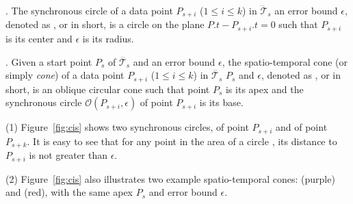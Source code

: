 . The synchronous circle of a data point $P_{s+i}$ ($1\le i\le k$) in $\dddot{\mathcal{T}}_s$ \wrt an error bound $\epsilon$, denoted as , or  in short, is a circle on the plane $P.t-P_{s+i}.t = 0$ such that $P_{s+i}$ is its center and $\epsilon$ is its radius.



. Given a start point $P_s$ of $\dddot{\mathcal{T}_s}$ and an error bound $\epsilon$, the spatio-temporal cone (or simply \textit{cone}) of a data point $P_{s+i}$ ($1\le i\le k$) in $\dddot{\mathcal{T}_s}$ \wrt $P_s$ and $\epsilon$, denoted as , or  in short, is an oblique circular cone such that point $P_s$ is its apex and the synchronous circle $\mathcal{O}(P_{s+i}, \epsilon)$ of point $P_{s+i}$ is its base.


\begin{example}
\label{exm-circles-cones}

(1) Figure~\ref{fig:cis} shows two synchronous circles,  of point $P_{s+i}$ and  of point $P_{s+k}$.
It is easy to see that for any point in the area of a circle , its distance to $P_{s+i}$ is not greater than $\epsilon$.

\sstab(2) Figure~\ref{fig:cis} also illustrates two example spatio-temporal cones:  {(purple)} and  (red), with the same apex $P_s$ and error bound $\epsilon$. \eop
\end{example}








